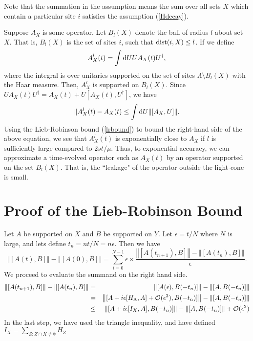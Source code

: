 \documentclass[twoside]{article}
\newcommand{\ret}{\nonumber \\}
\newcommand{\be}{\begin{equation}}
\newcommand{\ee}{\end{equation}}
\begin{document}
Note that the summation in the assumption means the sum over all sets $X$ which contain a particular site $i$ satisfies the assumption (\ref{Hdecay}).

Suppose $A_X$ is some operator.  Let $B_l(X)$ denote the ball of radius $l$ about
set $X$.  That is, $B_l(X)$ is the set of sites $i$, such that ${\rm dist}(i,X)\leq l$.
If we define
\be
\label{localized}
A_X^l(t)=\int {\rm d}U U A_X(t) U^\dagger,
\ee
where the integral is over unitaries supported on the set of sites $\Lambda \setminus  B_l(X)$ with the Haar measure.
Then, $A_X^l$ is supported on $B_l(X)$.  Since $U A_X(t)  U^\dagger=A_X(t)+U[A_X(t),U^\dagger]$, we have
\be
\Vert A_X^l(t)-A_X(t) \leq \int {\rm d}U \Vert [A_X ,U] \Vert.
\ee
Using the Lieb-Robinson bound (\ref{lrbound}) to bound the right-hand side of the above equation,
we see that $A_X^l(t)$ is exponentially close to $A_X$ if $l$ is sufficiently large compared to $2st/\mu$.  Thus,
to exponential accuracy, we can approximate a time-evolved operator such as $A_X(t)$ by an operator supported on the set
$B_l(X)$.  That is, the ``leakage" of the operator outside the light-cone is small.

\section{Proof of the Lieb-Robinson Bound}
Let $A$ be supported on $X$ and $B$ be supported on $Y$. Let $\epsilon = t/N$ where $N$ is large, and lets define $t_n = nt/N = n\epsilon$. Then we have
\be
\left\Vert[A(t),B]\right\Vert-\left\Vert[A(0),B]\right\Vert 
=\sum_{i=0}^{N-1}\epsilon\times
\frac{\left\Vert[A(t_{n+1}),B]\right\Vert-\left\Vert[A(t_n),B]\right\Vert}{\epsilon}.
\label{sumid} 
\ee
We proceed to evaluate the summand on the right hand side.
\begin{eqnarray}
\left\Vert[A(t_{n+1}),B]\right\Vert-\left\Vert[A(t_n),B]\right\Vert
&=&\left\Vert[A(\epsilon),B(-t_n)]\right\Vert-\left\Vert[A,B(-t_n)]\right\Vert\ret
&=&\left\Vert[A+i\epsilon[H_\Lambda,A]+{\cal O}(\epsilon^2),B(-t_n)]\right\Vert
-\left\Vert[A,B(-t_n)]\right\Vert\ret
&\le&\left\Vert[A+i\epsilon[I_X,A],B(-t_n)]\right\Vert
-\left\Vert[A,B(-t_n)]\right\Vert+{\cal O}(\epsilon^2)
\label{difnorm}
\end{eqnarray}
In the last step, we have used the triangle inequality, and have defined $I_X=\sum_{Z:Z\cap X\ne \emptyset}H_Z$
\end{document}
